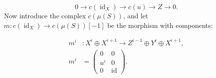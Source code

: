 \[
0\longrightarrow c(\operatorname{id}_X)\longrightarrow c(u)
\longrightarrow Z\longrightarrow0.
\]
Now introduce the complex $c(\mu(S))$, and let
$m\colon c(\operatorname{id}_X)\longrightarrow c(\mu(S))[-1]$ be the
morphism with components:

\begin{equation}
\begin{aligned}
m^i&\colon X^i\oplus X^{i+1}
  \longrightarrow Z^{i-1}\oplus Y^i\oplus X^{i+1},\\[2pt]
m^i&=
\begin{pmatrix}
0&0\\
u^i&0\\
0&\operatorname{id}
\end{pmatrix}.
\end{aligned}
\tag{1.3.2.2}
\end{equation}
\endgroup

